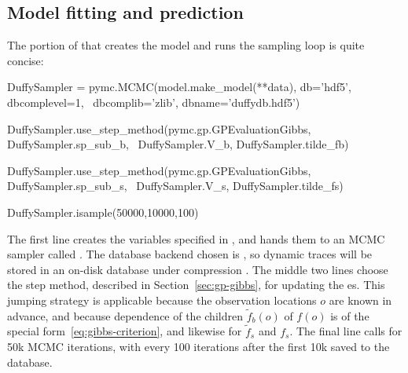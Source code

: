 \documentclass[article]{jss}
\begin{document}
\subsection{Model fitting and prediction}
The portion of  that creates the model and runs the sampling loop is quite concise: 
\begin{CodeInput}
DuffySampler = pymc.MCMC(model.make_model(**data), db='hdf5', dbcomplevel=1, \
    dbcomplib='zlib', dbname='duffydb.hdf5')

DuffySampler.use_step_method(pymc.gp.GPEvaluationGibbs, DuffySampler.sp_sub_b, \
    DuffySampler.V_b, DuffySampler.tilde_fb)

DuffySampler.use_step_method(pymc.gp.GPEvaluationGibbs, DuffySampler.sp_sub_s, \
    DuffySampler.V_s, DuffySampler.tilde_fs)

DuffySampler.isample(50000,10000,100)    
\end{CodeInput}
The first line creates the variables specified in , and hands them to an MCMC sampler called . The database backend chosen is , so dynamic traces will be stored in an on-disk  database under compression \citep{pymc}. The middle two lines choose the  step method, described in Section~\ref{sec:gp-gibbs}, for updating the es. This jumping strategy is applicable because the observation locations $o$ are known in advance, and because dependence of the children $\tilde f_b(o)$ of $f(o)$ is of the special form~\ref{eq:gibbs-criterion}, and likewise for $\tilde f_s$ and $f_s$. The final line calls for 50k MCMC iterations, with every 100 iterations after the first 10k saved to the database. 
\end{document}
